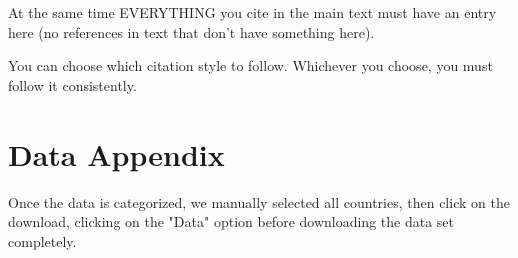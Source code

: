 \documentclass[12pt]{article}
\begin{document}
At the same time EVERYTHING you cite in the main text must have an entry here (no references in text that don't have something here).

You can choose which citation style to follow. Whichever you choose, you must follow it consistently.

\newpage
\section*{Data Appendix} \label{sec:appendixa}

Once the data is categorized, we manually selected all countries, then click on the download, clicking on the "Data" option before downloading the data set completely. 
\end{document}
